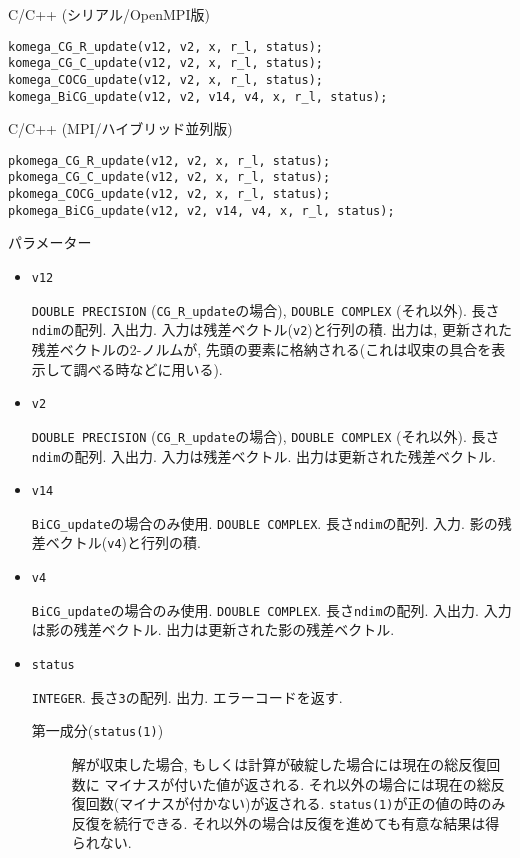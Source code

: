 \documentclass[12pt,titlepage]{jarticle}
\begin{document}
\noindent C/C++ (シリアル/OpenMPI版)
\begin{verbatim}
komega_CG_R_update(v12, v2, x, r_l, status);
komega_CG_C_update(v12, v2, x, r_l, status);
komega_COCG_update(v12, v2, x, r_l, status);
komega_BiCG_update(v12, v2, v14, v4, x, r_l, status);
\end{verbatim}

\noindent C/C++ (MPI/ハイブリッド並列版)
\begin{verbatim}
pkomega_CG_R_update(v12, v2, x, r_l, status);
pkomega_CG_C_update(v12, v2, x, r_l, status);
pkomega_COCG_update(v12, v2, x, r_l, status);
pkomega_BiCG_update(v12, v2, v14, v4, x, r_l, status);
\end{verbatim}

\noindent パラメーター

\begin{itemize}

\item \verb|v12|

  \verb|DOUBLE PRECISION| (\verb|CG_R_update|の場合),
  \verb|DOUBLE COMPLEX| (それ以外).
  長さ\verb|ndim|の配列. 入出力.
  入力は残差ベクトル(\verb|v2|)と行列の積.
  出力は, 更新された残差ベクトルの2-ノルムが,
  先頭の要素に格納される(これは収束の具合を表示して調べる時などに用いる).

\item \verb|v2|

  \verb|DOUBLE PRECISION| (\verb|CG_R_update|の場合),
  \verb|DOUBLE COMPLEX| (それ以外).
  長さ\verb|ndim|の配列. 入出力.
  入力は残差ベクトル.
  出力は更新された残差ベクトル.

\item \verb|v14|
  
  \verb|BiCG_update|の場合のみ使用. \verb|DOUBLE COMPLEX|.
  長さ\verb|ndim|の配列. 入力.
  影の残差ベクトル(\verb|v4|)と行列の積.
  
\item \verb|v4|
  
  \verb|BiCG_update|の場合のみ使用. \verb|DOUBLE COMPLEX|.
  長さ\verb|ndim|の配列. 入出力.
  入力は影の残差ベクトル.
  出力は更新された影の残差ベクトル.

\item \verb|status|

  \verb|INTEGER|. 長さ\verb|3|の配列. 出力. エラーコードを返す.
  \begin{description}
  \item [第一成分(\texttt{status(1)})]
    解が収束した場合, もしくは計算が破綻した場合には現在の総反復回数に
    マイナスが付いた値が返される.
    それ以外の場合には現在の総反復回数(マイナスが付かない)が返される.
    \verb|status(1)|が正の値の時のみ反復を続行できる.
    それ以外の場合は反復を進めても有意な結果は得られない.
    

\end{description}
\end{itemize}
\end{document}
